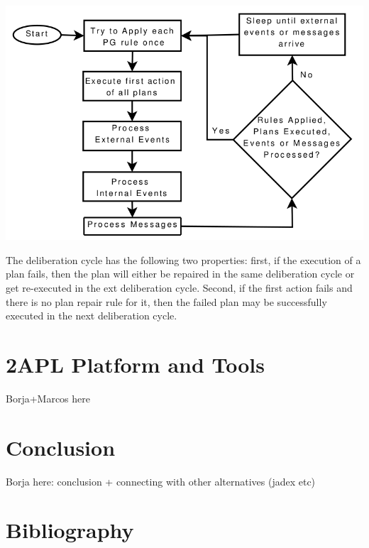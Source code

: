 \documentclass[a4paper]{article}
\begin{document}
\begin{center}
\includegraphics[keepaspectratio,scale=0.3]{fig/rcycle.png}
\end{center}

The deliberation cycle has the following two properties: first, if the execution of a plan fails, then the plan will either be repaired in the same deliberation cycle or get re-executed in the ext deliberation cycle. Second, if the first action fails and there is no plan repair rule for it, then the failed plan may be successfully executed in the next deliberation cycle.

\section{2APL Platform and Tools} %

Borja+Marcos here

\section{Conclusion} %

Borja here: conclusion + connecting with other alternatives (jadex etc)

\section{Bibliography}
\nocite{*}


\end{document}
